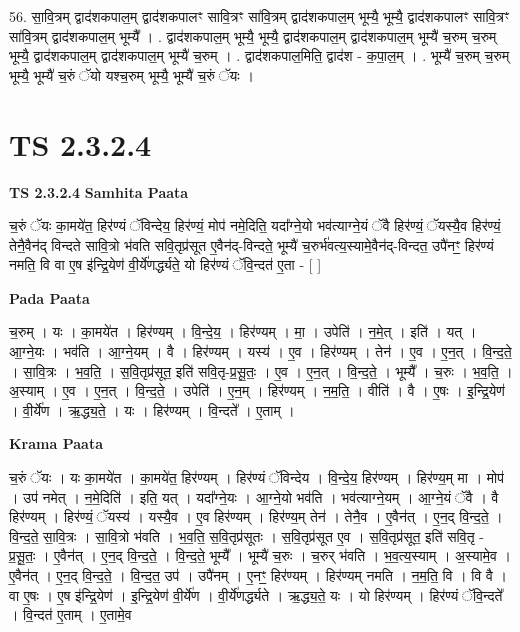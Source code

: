 \documentclass[17pt]{extarticle}
\begin{document}
56. सा॒वि॒त्रम् द्वाद॑शकपाल॒म् द्वाद॑शकपालꣳ सावि॒त्रꣳ सा॑वि॒त्रम् द्वाद॑शकपाल॒म् भूम्यै॒ भूम्यै॒ द्वाद॑शकपालꣳ सावि॒त्रꣳ सा॑वि॒त्रम् द्वाद॑शकपाल॒म् भूम्यै᳚ । . द्वाद॑शकपाल॒म् भूम्यै॒ भूम्यै॒ द्वाद॑शकपाल॒म् द्वाद॑शकपाल॒म् भूम्यै॑ च॒रुम् च॒रुम् भूम्यै॒ द्वाद॑शकपाल॒म् द्वाद॑शकपाल॒म् भूम्यै॑ च॒रुम् । . द्वाद॑शकपाल॒मिति॒ द्वाद॑श - क॒पा॒ल॒म् । . भूम्यै॑ च॒रुम् च॒रुम् भूम्यै॒ भूम्यै॑ च॒रुं ॅयो यश्च॒रुम् भूम्यै॒ भूम्यै॑ च॒रुं ॅयः । \newline
\pagebreak
{}
\section*{ TS 2.3.2.4 }

\textbf{TS 2.3.2.4 } \newline
\textbf{Samhita Paata} \newline

च॒रुं ॅयः का॒मये॑त॒ हिर॑ण्यं ॅविन्देय॒ हिर॑ण्यं॒ मोप॑ नमे॒दिति॒ यदा᳚ग्ने॒यो भव॑त्याग्ने॒यं ॅवै हिर॑ण्यं॒ ॅयस्यै॒व हिर॑ण्यं॒ तेनै॒वैन॑द् विन्दते सावि॒त्रो भ॑वति सवि॒तृप्र॑सूत ए॒वैन॑द्-विन्दते॒ भूम्यै॑ च॒रुर्भ॑वत्य॒स्यामे॒वैन॑द्-विन्दत॒ उपै॑नꣳ॒॒ हिर॑ण्यं नमति॒ वि वा ए॒ष इ॑न्द्रि॒येण॑ वी॒र्ये॑णर्द्ध्यते॒ यो हिर॑ण्यं ॅवि॒न्दत॑ ए॒ता - [  ] \newline

\textbf{Pada Paata} \newline

च॒रुम् । यः । का॒मये॑त । हिर॑ण्यम् । वि॒न्दे॒य॒ । हिर॑ण्यम् । मा॒ । उपेति॑ । न॒मे॒त् । इति॑ । यत् । आ॒ग्ने॒यः । भव॑ति । आ॒ग्ने॒यम् । वै । हिर॑ण्यम् । यस्य॑ । ए॒व । हिर॑ण्यम् । तेन॑ । ए॒व । ए॒न॒त् । वि॒न्द॒ते॒ । सा॒वि॒त्रः । भ॒व॒ति॒ । स॒वि॒तृप्र॑सूत॒ इति॑ सवि॒तृ-प्र॒सू॒तः॒ । ए॒व । ए॒न॒त् । वि॒न्द॒ते॒ । भूम्यै᳚ । च॒रुः । भ॒व॒ति॒ । अ॒स्याम् । ए॒व । ए॒न॒त् । वि॒न्द॒ते॒ । उपेति॑ । ए॒न॒म् । हिर॑ण्यम् । न॒म॒ति॒ । वीति॑ । वै । ए॒षः । इ॒न्द्रि॒येण॑ । वी॒र्ये॑ण । ऋ॒द्ध्य॒ते॒ । यः । हिर॑ण्यम् । वि॒न्दते᳚ । ए॒ताम् ।  \newline


\textbf{Krama Paata} \newline

च॒रुं ॅयः । यः का॒मये॑त । का॒मये॑त॒ हिर॑ण्यम् । हिर॑ण्यं ॅविन्देय । वि॒न्दे॒य॒ हिर॑ण्यम् । हिर॑ण्य॒म् मा । मोप॑ । उप॑ नमेत् । न॒मे॒दिति॑ । इति॒ यत् । यदा᳚ग्ने॒यः । आ॒ग्ने॒यो भव॑ति । भव॑त्याग्ने॒यम् । आ॒ग्ने॒यं ॅवै । वै हिर॑ण्यम् । हिर॑ण्यं॒ ॅयस्य॑ । यस्यै॒व । ए॒व हिर॑ण्यम् । हिर॑ण्य॒म् तेन॑ । तेनै॒व । ए॒वैन॑त् । ए॒न॒द् वि॒न्द॒ते॒ । वि॒न्द॒ते॒ सा॒वि॒त्रः । सा॒वि॒त्रो भ॑वति । भ॒व॒ति॒ स॒वि॒तृप्र॑सूतः । स॒वि॒तृप्र॑सूत ए॒व । स॒वि॒तृप्र॑सूत॒ इति॑ सवि॒तृ - प्र॒सू॒तः॒ । ए॒वैन॑त् । ए॒न॒द् वि॒न्द॒ते॒ । वि॒न्द॒ते॒ भूम्यै᳚ । भूम्यै॑ च॒रुः । च॒रुर् भ॑वति । भ॒व॒त्य॒स्याम् । अ॒स्यामे॒व । ए॒वैन॑त् । ए॒न॒द् वि॒न्द॒ते॒ । वि॒न्द॒त॒ उप॑ । उपै॑नम् । ए॒नꣳ॒॒ हिर॑ण्यम् । हिर॑ण्यम् नमति । न॒म॒ति॒ वि । वि वै । वा ए॒षः । ए॒ष इ॑न्द्रि॒येण॑ । इ॒न्द्रि॒येण॑ वी॒र्ये॑ण । वी॒र्ये॑णर्द्ध्यते । ऋ॒द्ध्य॒ते॒ यः । यो हिर॑ण्यम् । हिर॑ण्यं ॅवि॒न्दते᳚ । वि॒न्दत॑ ए॒ताम् । ए॒तामे॒व \newline
\end{document}
